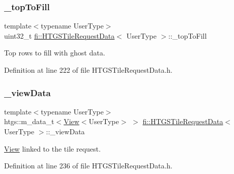 \subsubsection{\texorpdfstring{\+\_\+top\+To\+Fill}{\_topToFill}}
{\footnotesize\ttfamily template$<$typename User\+Type$>$ \\
uint32\+\_\+t \hyperlink{classfi_1_1HTGSTileRequestData}{fi\+::\+H\+T\+G\+S\+Tile\+Request\+Data}$<$ User\+Type $>$\+::\+\_\+top\+To\+Fill\hspace{0.3cm}{\ttfamily [private]}}



Top rows to fill with ghost data. 



Definition at line 222 of file H\+T\+G\+S\+Tile\+Request\+Data.\+h.

\mbox{\label{classfi_1_1HTGSTileRequestData_a53b78c667d486bd05e3c0afc1e0db5a5}} 
\subsubsection{\texorpdfstring{\+\_\+view\+Data}{\_viewData}}
{\footnotesize\ttfamily template$<$typename User\+Type$>$ \\
htgs\+::m\+\_\+data\+\_\+t$<$\hyperlink{classfi_1_1View}{View}$<$User\+Type$>$ $>$ \hyperlink{classfi_1_1HTGSTileRequestData}{fi\+::\+H\+T\+G\+S\+Tile\+Request\+Data}$<$ User\+Type $>$\+::\+\_\+view\+Data\hspace{0.3cm}{\ttfamily [private]}}



\hyperlink{classfi_1_1View}{View} linked to the tile request. 



Definition at line 236 of file H\+T\+G\+S\+Tile\+Request\+Data.\+h.

\mbox{\label{classfi_1_1HTGSTileRequestData_aaa91ef9b83ed81cdfb55df0d6297ca24}} 
